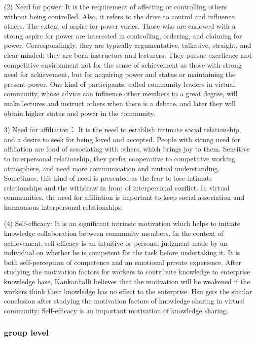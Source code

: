 \documentclass{elsarticle}
\begin{document}
(2)  Need for power: It is the requirement of affecting or controlling
others without being controlled. Also, it refers to the drive to
control and influence others. The extent of aspire for power
varies. Those who are endowed with a strong aspire for power are
interested in controlling, ordering, and claiming for
power. Correspondingly, they are typically argumentative, talkative,
straight, and clear-minded; they are born instructors and
lecturers. They pursue excellence and competitive environment not for
the sense of achievement as those with strong need for achievement,
but for acquiring power and status or maintaining the present
power. One kind of participants, called community leaders in virtual
community, whose advice can influence other members to a great degree,
will make lectures and instruct others when there is a debate, and
later they will obtain higher status and power in the community. 

3)  Need for affiliation： It is the need to establish intimate social
relationship, and a desire to seek for being loved and
accepted. People with strong need for affiliation are fond of
associating with others, which brings joy to them. Sensitive to
interpersonal relationship, they prefer cooperative to competitive
working atmosphere, and need more communication and mutual
understanding. Sometimes, this kind of need is presented as the fear
to lose intimate relationships and the withdraw in front of
interpersonal conflict. In virtual communities, the need for
affiliation is important to keep social association and harmonious
interpersonal relationships.

(4)  Self-efficacy: It is an significant intrinsic motivation which
helps to initiate knowledge collaboration between community
members. In the context of achievement, self-efficacy is an intuitive
or personal judgment made by an individual on whether he is competent
for the task before undertaking it. It is both self-perception of
competence and an emotional private experience. After studying the
motivation factors for workers to contribute knowledge to enterprise
knowledge base,  Kankanhalli believes that the motivation will be
weakened if the workers think their knowledge has no effect to the
enterprise. Hsu gets the similar conclusion after studying the
motivation factors of knowledge sharing in virtual community:
Self-efficacy is an important motivation of knowledge sharing.

\subsubsection{group level}
\label{sec:group-level}
\end{document}
